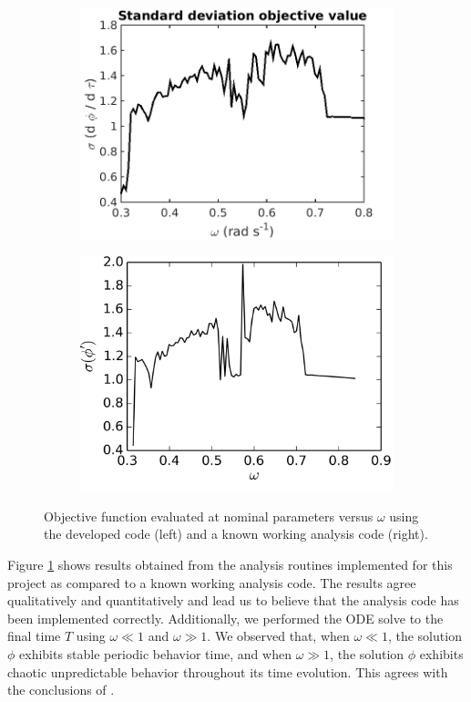 \documentclass[11pt]{article}
\begin{document}
\begin{figure}[hbt!]
\centering
\begin{subfigure}{.5\textwidth}
\centering
\includegraphics[width=.99\linewidth]{verify}
\end{subfigure}%
\begin{subfigure}{.5\textwidth}
\centering
\includegraphics[width=.99\linewidth]{compare}
\end{subfigure}
\caption{Objective function evaluated at nominal
parameters versus $\omega$ using the developed code (left)
and a known working analysis code (right).}
\label{fig:verify}
\end{figure}

Figure \ref{fig:verify} shows results
obtained from the analysis routines implemented for this
project as compared to a known working analysis code.
The results agree qualitatively and quantitatively
and lead us to believe that the analysis code has
been implemented correctly. Additionally, we performed
the ODE solve to the final time $T$ using
$\omega \ll 1$ and $\omega \gg 1$. We observed that,
when $\omega \ll 1$, the solution $\phi$ exhibits
stable periodic behavior time, and when $\omega \gg 1$,
the solution $\phi$ exhibits chaotic unpredictable
behavior throughout its time evolution. This agrees
with the conclusions of \cite{chaos}.
\end{document}
